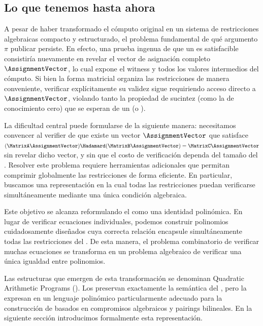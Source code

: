 \subsection{Lo que tenemos hasta ahora}

A pesar de haber transformado el cómputo original en un sistema de restricciones algebraicas compacto y estructurado, el problema fundamental de qué argumento $\pi$ publicar persiste. En efecto, una prueba ingenua de que un \ROneCS es satisfacible consistiría nuevamente en revelar el vector de asignación completo $\AssignmentVector$, lo cual expone el witness y todos los valores intermedios del cómputo. Si bien la forma matricial organiza las restricciones de manera conveniente, verificar explícitamente su validez sigue requiriendo acceso directo a $\AssignmentVector$, violando tanto la propiedad de sucintez (como la de conocimiento cero) que se esperan de un \SNARK (o \zkSNARK).

La dificultad central puede formularse de la siguiente manera: necesitamos convencer al verifier de que existe un vector $\AssignmentVector$ que satisface $(\MatrixA\AssignmentVector) \Hadamard (\MatrixB\AssignmentVector) = \MatrixC\AssignmentVector$ sin revelar dicho vector, y sin que el costo de verificación dependa del tamaño del \ROneCS. Resolver este problema requiere herramientas adicionales que permitan comprimir globalmente las restricciones de forma eficiente. En particular, buscamos una representación en la cual todas las restricciones puedan verificarse simultáneamente mediante una única condición algebraica.

Este objetivo se alcanza reformulando el \ROneCS como una identidad polinómica. En lugar de verificar ecuaciones individuales, podemos construir polinomios cuidadosamente diseñados cuya correcta relación encapsule simultáneamente todas las restricciones del \ROneCS. De esta manera, el problema combinatorio de verificar muchas ecuaciones se transforma en un problema algebraico de verificar una única igualdad entre polinomios.

Las estructuras que emergen de esta transformación se denominan Quadratic Arithmetic Programs (\QAP). Los \QAP preservan exactamente la semántica del \ROneCS, pero la expresan en un lenguaje polinómico particularmente adecuado para la construcción de \SNARK basados en compromisos algebraicos y pairings bilineales. En la siguiente sección introducimos formalmente esta representación.
